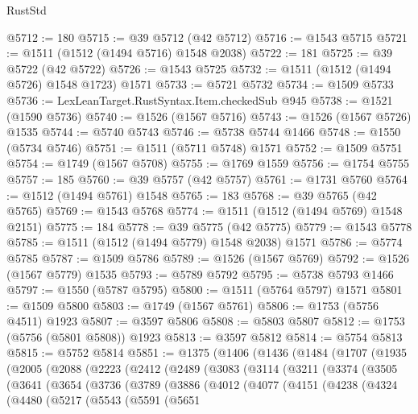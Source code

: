 \begin{lexlean}{RustStd}
\begin{coremodule}
{\begin{coremodule}
{{{{{{{{{{{{{{{{{{{{{{{{{{{{{{{{{{{@5712 := 180
@5715 := @39 @5712 (@42 @5712)
@5716 := @1543 @5715
@5721 := @1511 (@1512 (@1494 @5716) @1548 @2038)
@5722 := 181
@5725 := @39 @5722 (@42 @5722)
@5726 := @1543 @5725
@5732 := @1511 (@1512 (@1494 @5726) @1548 @1723) @1571
@5733 := @5721 @5732
@5734 := @1509 @5733
@5736 := LexLeanTarget.RustSyntax.Item.checkedSub @945
@5738 := @1521 (@1590 @5736)
@5740 := @1526 (@1567 @5716)
@5743 := @1526 (@1567 @5726) @1535
@5744 := @5740 @5743
@5746 := @5738 @5744 @1466
@5748 := @1550 (@5734 @5746)
@5751 := @1511 (@5711 @5748) @1571
@5752 := @1509 @5751
@5754 := @1749 (@1567 @5708)
@5755 := @1769 @1559
@5756 := @1754 @5755
@5757 := 185
@5760 := @39 @5757 (@42 @5757)
@5761 := @1731 @5760
@5764 := @1512 (@1494 @5761) @1548
@5765 := 183
@5768 := @39 @5765 (@42 @5765)
@5769 := @1543 @5768
@5774 := @1511 (@1512 (@1494 @5769) @1548 @2151)
@5775 := 184
@5778 := @39 @5775 (@42 @5775)
@5779 := @1543 @5778
@5785 := @1511 (@1512 (@1494 @5779) @1548 @2038) @1571
@5786 := @5774 @5785
@5787 := @1509 @5786
@5789 := @1526 (@1567 @5769)
@5792 := @1526 (@1567 @5779) @1535
@5793 := @5789 @5792
@5795 := @5738 @5793 @1466
@5797 := @1550 (@5787 @5795)
@5800 := @1511 (@5764 @5797) @1571
@5801 := @1509 @5800
@5803 := @1749 (@1567 @5761)
@5806 := @1753 (@5756 @4511) @1923
@5807 := @3597 @5806
@5808 := @5803 @5807
@5812 := @1753 (@5756 (@5801 @5808)) @1923
@5813 := @3597 @5812
@5814 := @5754 @5813
@5815 := @5752 @5814
@5851 := @1375
    (@1406
      (@1436
        (@1484
          (@1707
            (@1935
              (@2005
                (@2088
                  (@2223
                    (@2412
                      (@2489
                        (@3083
                          (@3114
                            (@3211
                              (@3374
                                (@3505
                                  (@3641
                                    (@3654
                                      (@3736
                                        (@3789
                                          (@3886
                                            (@4012
                                              (@4077
                                                (@4151
                                                  (@4238
                                                    (@4324
                                                      (@4480
                                                        (@5217
                                                          (@5543
                                                            (@5591
                                                              (@5651
}}}}}}}}}}}}}}}}}}}}}}}}}}}}}}}}}}}
\end{coremodule}}
\end{coremodule}
\end{lexlean}
